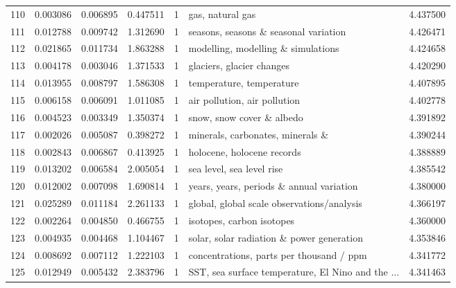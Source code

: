 \begin{tabular}{lrrrrlr}
110 &    0.003086 &  0.006895 &        0.447511 &           1 &                                   gas, natural gas &  4.437500 \\
111 &    0.012788 &  0.009742 &        1.312690 &           1 &              seasons, seasons \& seasonal variation &  4.426471 \\
112 &    0.021865 &  0.011734 &        1.863288 &           1 &                 modelling, modelling \& simulations &  4.424658 \\
113 &    0.004178 &  0.003046 &        1.371533 &           1 &                          glaciers, glacier changes &  4.420290 \\
114 &    0.013955 &  0.008797 &        1.586308 &           1 &                           temperature, temperature &  4.407895 \\
115 &    0.006158 &  0.006091 &        1.011085 &           1 &                       air pollution, air pollution &  4.402778 \\
116 &    0.004523 &  0.003349 &        1.350374 &           1 &                          snow, snow cover \& albedo &  4.391892 \\
117 &    0.002026 &  0.005087 &        0.398272 &           1 &                  minerals, carbonates, minerals \&  &  4.390244 \\
118 &    0.002843 &  0.006867 &        0.413925 &           1 &                         holocene, holocene records &  4.388889 \\
119 &    0.013202 &  0.006584 &        2.005054 &           1 &                          sea level, sea level rise &  4.385542 \\
120 &    0.012002 &  0.007098 &        1.690814 &           1 &           years, years, periods \& annual variation &  4.380000 \\
121 &    0.025289 &  0.011184 &        2.261133 &           1 &         global, global scale observations/analysis &  4.366197 \\
122 &    0.002264 &  0.004850 &        0.466755 &           1 &                          isotopes, carbon isotopes &  4.360000 \\
123 &    0.004935 &  0.004468 &        1.104467 &           1 &          solar, solar radiation \& power generation &  4.353846 \\
124 &    0.008692 &  0.007112 &        1.222103 &           1 &           concentrations, parts per thousand / ppm &  4.341772 \\
125 &    0.012949 &  0.005432 &        2.383796 &           1 &  SST, sea surface temperature, El Nino and the ... &  4.341463 \\

\end{tabular}

